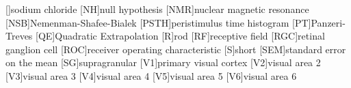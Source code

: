 \begin{acronym}[AUROC]
        []{sodium chloride}
        [NH]{null hypothesis}
        [NMR]{nuclear magnetic resonance}
        [NSB]{{N}emenman-{S}hafee-{B}ialek}
        [PSTH]{peristimulus time histogram}
        [PT]{{P}anzeri-{T}reves}
        [QE]{Quadratic Extrapolation}
        [R]{rod}
        [RF]{receptive field}
        [RGC]{retinal ganglion cell}
        [ROC]{receiver operating characteristic}
        [S]{short}
        [SEM]{standard error on the mean}
        [SG]{supragranular}
        [V1]{primary visual cortex}
        [V2]{visual area 2}
        [V3]{visual area 3}
        [V4]{visual area 4}
        [V5]{visual area 5}
        [V6]{visual area 6}
    \end{acronym}                     
\endgroup

\cleardoublepage
